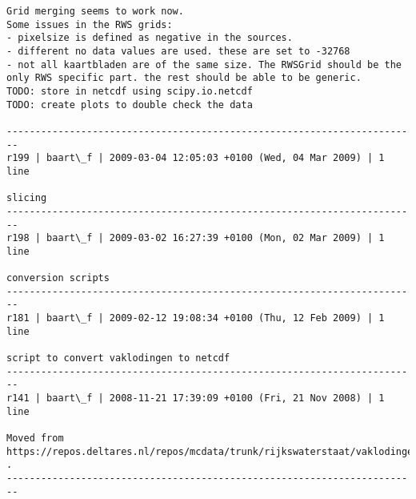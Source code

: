 \documentclass[9]{report}
\begin{document}
\begin{description}
\begin{verbatim}
Grid merging seems to work now. 
Some issues in the RWS grids:
- pixelsize is defined as negative in the sources.
- different no data values are used. these are set to -32768
- not all kaartbladen are of the same size. The RWSGrid should be the only RWS specific part. the rest should be able to be generic. 
TODO: store in netcdf using scipy.io.netcdf
TODO: create plots to double check the data

------------------------------------------------------------------------
r199 | baart\_f | 2009-03-04 12:05:03 +0100 (Wed, 04 Mar 2009) | 1 line

slicing
------------------------------------------------------------------------
r198 | baart\_f | 2009-03-02 16:27:39 +0100 (Mon, 02 Mar 2009) | 1 line

conversion scripts
------------------------------------------------------------------------
r181 | baart\_f | 2009-02-12 19:08:34 +0100 (Thu, 12 Feb 2009) | 1 line

script to convert vaklodingen to netcdf
------------------------------------------------------------------------
r141 | baart\_f | 2008-11-21 17:39:09 +0100 (Fri, 21 Nov 2008) | 1 line

Moved from https://repos.deltares.nl/repos/mcdata/trunk/rijkswaterstaat/vaklodingen .
------------------------------------------------------------------------


\end{verbatim}
\end{description}
\end{document}
